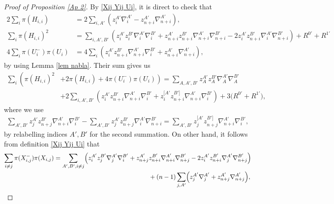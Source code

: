 \documentclass[a4paper,11pt]{amsart}
\numberwithin{equation}{section}
\begin{document}
\begin{proof}[Proof of Proposition \ref{Ap 2}]
By \eqref{Xij Yij Ui}, it is direct to check that
\begin{align*}
2\sum_{i} \pi(H_{i,i})&=2\sum_{i,A'}\left( z_{i}^{A'}\nabla_i^{A'}-z_{n+i}^{A'}\nabla_{n+i}^{A'}\right),\\
\sum_{i} \pi(H_{i,i})^2
&= \sum_{i,A',B'} \left( z_{i}^{A'} z_{i}^{B'} \nabla_{i}^{A'} \nabla_{i}^{B'}+ z_{n+i}^{A'} z_{n+i}^{B'} \nabla_{n+i}^{A'} \nabla_{n+i}^{B'} - 2 z_{i}^{A'} z_{n+i}^{B'} \nabla_{i}^{A'} \nabla_{n+i}^{B'} \right)
 +R^{0'}+R^{1'}\\
4\sum_{i} \pi(U_i^{-})\pi(U_i)&= 4\sum_{i}\left(z_{i}^{A'} z_{n+i}^{B'} \nabla_{n+i}^{A'} \nabla_{i}^{B'} + z_{n+i}^{A'} \nabla_{n+i}^{A'}\right),
\end{align*}
by using Lemma \ref{lem nabla}.
Their sum gives us
\begin{equation}\begin{aligned}\label{piHU}
\sum_{i}\left( \pi(H_{i,i})^2 \right.&\left.+ 2\pi(H_{i,i}) + 4\pi(U_i^{-})\pi(U_i)\right)
= \sum_{A,A',B'}z_{A}^{A'} z_{A}^{B'} \nabla_{A}^{A'} \nabla_{A}^{B'}\\
&+2\sum_{i,A',B'}\left(z_{i}^{A'} z_{n+i}^{B'} \nabla_{n+i}^{A'} \nabla_{i}^{B'}+z_{i}^{[A'} z_{n+i}^{B']} \nabla_{n+i}^{A'} \nabla_{i}^{B'}\right)
+ 3 \bigl(R^{0'}+R^{1'}\bigr),
\end{aligned}\end{equation}
where we use
\begin{equation}\begin{aligned}\label{znabla}
\sum_{A',B'}z_{j}^{A'} z_{n+j}^{B'} \nabla_{n+i}^{A'} \nabla_{i}^{B'}-\sum_{A',B'}z_{j}^{A'} z_{n+j}^{B'} \nabla_{i}^{A'} \nabla_{n+i}^{B'}=\sum_{A',B'}z_{j}^{[A'} z_{n+j}^{B']} \nabla_{n+i}^{A'} \nabla_{i}^{B'},
\end{aligned}\end{equation}
by relabelling indices $A',B'$ for the second summation. On other hand, it follows from definition \eqref{Xij Yij Ui}  that
\begin{equation}\begin{split}\label{piXXYY}
\sum_{i\neq j}\pi(X_{i,j}^-)\pi(X_{i,j})
=\sum_{A',B',i\neq j}\Bigl( z_{i}^{A'} z_{j}^{B'} \nabla_{j}^{A'} \nabla_{i}^{B'}
+ z_{n+j}^{A'} &z_{n+i}^{B'}\nabla_{n+i}^{A'} \nabla_{n+j}^{B'}- 2z_{i}^{A'} z_{n+i}^{B'} \nabla_{j}^{A'} \nabla_{n+j}^{B'}\Bigr) \\
&+(n-1)\sum_{j,A'}\Bigr(z_j^{A'}\nabla_{j}^{A'}+z_{n+j}^{A'}\nabla_{n+j}^{A'}\Bigr),\\
\end{split}\end{equation}

\end{proof}
\end{document}
